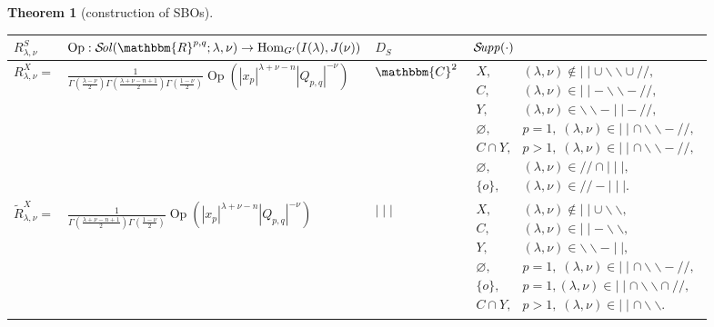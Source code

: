 \documentclass[12pt]{article} %
\newcommand{\nin}{\not\in}
\newcommand{\tmop}[1]{\ensuremath{\operatorname{#1}}}
\newtheorem{theorem}{Theorem}
\newcommand{\Sol}{\mathcal{S}\!{\it ol}}
\newcommand{\Supp}{\mathcal{S}\!{\it upp}}
\theoremstyle{definition}
\theoremstyle{exampstyle} \newtheorem{examp}[theorem]{Theorem}
\renewcommand{\Q}{Q_{p,q}}
\begin{document}
\begin{theorem}[construction of SBOs]
\hspace{-2.0cm}\begin{tabular}{@{}|@{}l@{}|@{}l@{}|l@{}|@{}l@{}|}
  \hline
  $R_{\lambda,\nu}^S$& $\tmop{Op} : 
  \Sol(\mathbbm{R}^{p, q} ; \lambda, \nu)
  \rightarrow \tmop{Hom}_{G'} (I (\lambda), J (\nu))$ & $D_S\,$ &
  $\,{\Supp} (\cdot)$\\
  \hline
  $R_{\lambda, \nu}^X =$ & $ \frac{1}{\Gamma \left( \frac{\lambda - \nu}{2} \right) \Gamma \left(
  \frac{\lambda + \nu - n + 1}{2} \right) \Gamma \left( \frac{1 - \nu}{2}
  \right)}{\tmop{Op} \left(| x_p |^{\lambda + \nu - n}
  | \Q |^{- \nu} \right)}$ & $\mathbbm{C}^2$ & $\left.
  \begin{array}{ll}
    X, & (\lambda, \nu) \nin \mid \mid \cup \backslash\backslash \cup / /,\\
    C, & (\lambda, \nu) \in \mid \mid -\backslash\backslash - / /,\\
    Y, & (\lambda, \nu) \in \backslash\backslash - \mid \mid - / /,\\
    \varnothing, & p = 1, \; (\lambda, \nu) \in \mid \mid \cap
    \backslash\backslash - / /,\\
    C \cap Y, & p > 1, \; (\lambda, \nu) \in \mid \mid \cap
    \backslash\backslash - / /,\\
    \varnothing, & (\lambda, \nu) \in / / \cap \mid \mid \mid,\\
    \{ o \}, & (\lambda, \nu) \in / / - \mid \mid \mid\!.
  \end{array} \right.$\\
  \hline
  $\tilde{R}^X_{\lambda, \nu} =$ & $\frac{1}{\Gamma \left( \frac{\lambda + \nu - n + 1}{2}
  \right) \Gamma \left( \frac{1 - \nu}{2} \right)}{\tmop{Op} \left( | x_p |^{\lambda +
  \nu - n} | \Q |^{- \nu}\right)} $ & $
   \mid \mid \mid$ &
$\left. \begin{array}{ll}
  X, & (\lambda, \nu) \nin \mid \mid \cup \backslash\backslash,\\
  C, & (\lambda, \nu) \in \mid \mid -\backslash\backslash,\\
  Y, & (\lambda, \nu) \in \backslash\backslash - \mid \mid,\\
  \varnothing, & p = 1, \; (\lambda, \nu) \in \mid \mid \cap
  \backslash\backslash - / /,\\
  \{ o \}, & p = 1, (\lambda, \nu) \in \mid \mid \cap \backslash\backslash
  \cap / /,\\
  C \cap Y, & p > 1, \; (\lambda, \nu) \in \mid \mid \cap \backslash\backslash
  .
\end{array} \right.$\\

\end{tabular}
\end{theorem}
\end{document}
